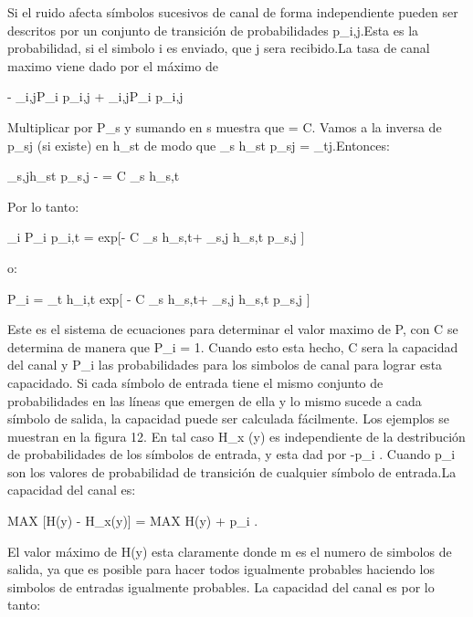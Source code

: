 \begin{centerMe gusta ·  · Compartir · Hace 9 minutos · }
Si el ruido afecta símbolos sucesivos de canal de forma independiente pueden ser descritos por un conjunto de transici\'on de probabilidades p_{i,j}.Esta es la probabilidad, si el simbolo i es enviado, que j sera recibido.La tasa de canal maximo viene dado por el m\'aximo de

\begin{center}
- \sum_{i,j}P_i p_{i,j}  + \sum_{i,j}P_i p_{i,j}
\end{center}
 
Multiplicar por P_s y sumando en s muestra que \mu = C. Vamos a la inversa de p_{sj} (si existe) en h_{st}  de modo que \sum_{s} h_{st} p_{sj} = \delta_{tj}.Entonces: 

\begin{center}
\sum_{s,j}h_{st} p_{s,j}  -  = C \sum_{s} h_{s,t}
\end{center}
Por lo tanto:

\begin{center}
\sum_{i} P_i p_{i,t} = exp[- C \sum_{s} h_{s,t}+ \sum_{s,j} h_{s,t} p_{s,j} ]
\end{center}

o:  
\begin{center}
P_i = \sum_{t} h_{i,t} exp[ - C \sum_{s} h_{s,t}+ \sum_{s,j} h_{s,t} p_{s,j}  ]
\end{center}


Este es el sistema de ecuaciones para determinar el valor maximo de P, con C se determina de manera que \sum P_i = 1. Cuando esto esta hecho, C sera la capacidad del canal y P_i las probabilidades para los simbolos de canal para lograr esta capacidado.
Si cada s\'imbolo de entrada tiene el mismo conjunto de probabilidades en las l\'ineas que emergen de ella y lo mismo sucede a cada s\'imbolo de salida, la capacidad puede ser calculada f\'acilmente. Los ejemplos se muestran en la figura 12. En tal caso H_x (y) es independiente de la destribuci\'on de probabilidades de los s\'imbolos de entrada, y esta dad por -\sum p_i . Cuando p_i son los valores de probabilidad de transici\'on de cualquier s\'imbolo de entrada.La capacidad del canal es:

\begin{center}
MAX [H(y) - H_x(y)] = MAX H(y) + \sum p_i .
\end{center}
  
El valor m\'aximo de H(y) esta claramente   donde m es el numero de simbolos de salida, ya que es posible para hacer todos igualmente probables haciendo los simbolos de entradas igualmente probables. La capacidad del canal es por lo tanto:


\end{centerMe gusta ·  · Compartir · Hace 9 minutos · }

